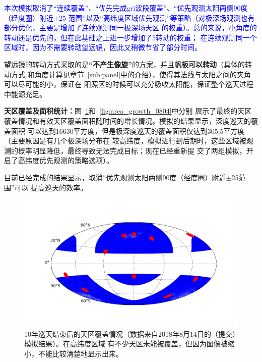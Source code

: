 \documentclass[a4paper,11pt]{ctexart}
\newcommand{\BT}[1]{\textcolor{blue}{#1}}
\begin{document}
\BT{本次模拟取消了“连续覆盖”、“优先完成gri波段覆盖”、“优先观测太阳两侧90度（经度圈）附近$\pm$25\textdegree
范围”以及“高纬度区域优先观测”等策略（对极深场观测也有部分优化，主要是增加了连续观测同一极深场天区
的权重）。总的来说，小角度的转动还是优先的，但在此基础之上进一步增加了5\textdegree 转动的权重；
在连续观测同一个区域时，因为不需要转动望远镜，因此又稍微节省了部分时间。}

望远镜的转动方式采取的是\textbf{“不产生像旋”}的方案，并且\textbf{帆板可以转动}（具体的转动方式
和角度计算见章节~\ref{sub:panel}中的介绍），使得其法线与太阳之间的夹角可以尽可能的小，保证在
阳照区的时候可以充分吸收太阳能，保证整个巡天过程中能源充足。

\textbf{天区覆盖及面积统计：}图~\ref{fig:covered_sky_0814}和~\ref{fig:area_growth_0804}中分别
展示了最终的天区覆盖情况和有效天区覆盖面积随时间的增长情况。模拟的结果显示，深度巡天的覆盖面积
可以达到16630平方度，但是极深度巡天的覆盖面积仅达到305.5平方度（主要原因是有几个极深场分布在
较高纬度，模拟进行到后期时，这些区域被观测的概率明显降低，最终导致无法完成目标；现在已经重新提
交了两组模拟，开启了高纬度优先观测的策略选项）。

目前已经完成的结果显示，取消“优先观测太阳两侧90度（经度圈）附近$\pm$25\textdegree 范围”可以
提高巡天的效率。

\begin{figure}[h!]
\centering
\includegraphics[width=1.3\textwidth,angle=-90]{figures/covered_sky_0814_test-A.png}
\caption{10年巡天结束后的天区覆盖情况（数据来自2018年8月14日的（提交）模拟结果）。在高纬度区域
有不少天区未能被覆盖，但因为图像被缩小，不能比较清楚地显示出来。}
\label{fig:covered_sky_0814}
\end{figure}
\end{document}

